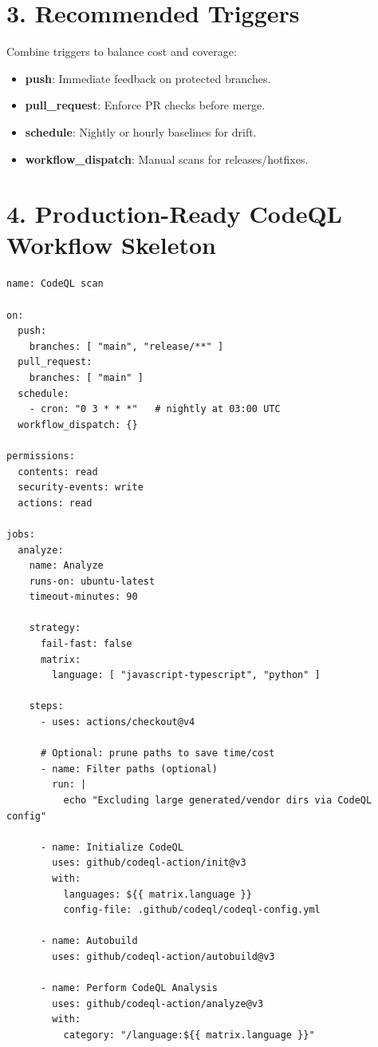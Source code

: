 \documentclass[11pt]{article}
\begin{document}
\section*{3. Recommended Triggers}
Combine triggers to balance cost and coverage:
\begin{itemize}
  \item \textbf{push}: Immediate feedback on protected branches.
  \item \textbf{pull\_request}: Enforce PR checks before merge.
  \item \textbf{schedule}: Nightly or hourly baselines for drift.
  \item \textbf{workflow\_dispatch}: Manual scans for releases/hotfixes.
\end{itemize}
\clearpage

\section*{4. Production-Ready CodeQL Workflow Skeleton}
\begin{verbatim}
name: CodeQL scan

on:
  push:
    branches: [ "main", "release/**" ]
  pull_request:
    branches: [ "main" ]
  schedule:
    - cron: "0 3 * * *"   # nightly at 03:00 UTC
  workflow_dispatch: {}

permissions:
  contents: read
  security-events: write
  actions: read

jobs:
  analyze:
    name: Analyze
    runs-on: ubuntu-latest
    timeout-minutes: 90

    strategy:
      fail-fast: false
      matrix:
        language: [ "javascript-typescript", "python" ]

    steps:
      - uses: actions/checkout@v4

      # Optional: prune paths to save time/cost
      - name: Filter paths (optional)
        run: |
          echo "Excluding large generated/vendor dirs via CodeQL config"

      - name: Initialize CodeQL
        uses: github/codeql-action/init@v3
        with:
          languages: ${{ matrix.language }}
          config-file: .github/codeql/codeql-config.yml

      - name: Autobuild
        uses: github/codeql-action/autobuild@v3

      - name: Perform CodeQL Analysis
        uses: github/codeql-action/analyze@v3
        with:
          category: "/language:${{ matrix.language }}"
\end{verbatim}
\end{document}
